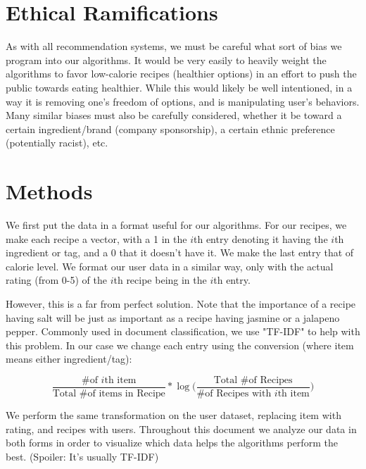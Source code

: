 \documentclass[11pt]{article}
\newcommand*\textfrac[2]{
  \frac{\text{#1}}{\text{#2}}
}
\begin{document}
\section{Ethical Ramifications}
As with all recommendation systems, we must be careful what sort of bias we program into our algorithms. It would be very easily to heavily weight the algorithms to favor low-calorie recipes (healthier options) in an effort to push the public towards eating healthier. While this would likely be well intentioned, in a way it is removing one's freedom of options, and is manipulating user's behaviors. Many similar biases must also be carefully considered, whether it be toward a certain ingredient/brand (company sponsorship), a certain ethnic preference (potentially racist), etc.

\section{Methods}

We first put the data in a format useful for our algorithms. For our recipes, we make each recipe a vector, with a 1 in the $i$th entry denoting it having the $i$th ingredient or tag, and a 0 that it doesn't have it. We make the last entry that of calorie level. We format our user data in a similar way, only with the actual rating (from 0-5) of the $i$th recipe being in the $i$th entry.

However, this is a far from perfect solution. Note that the importance of a recipe having salt will be just as important as a recipe having jasmine or a jalapeno pepper. Commonly used in document classification, we use "TF-IDF" to help with this problem. In our case we change each entry using the conversion (where item means either ingredient/tag):

$$\textfrac{\# of $i$th item}{Total \# of items in Recipe} * \log \Big( \textfrac{Total \# of Recipes}{\# of Recipes with $i$th item} \Big)$$

We perform the same transformation on the user dataset, replacing item with rating, and recipes with users. Throughout this document we analyze our data in both forms in order to visualize which data helps the algorithms perform the best. (Spoiler: It's usually TF-IDF)
\end{document}
